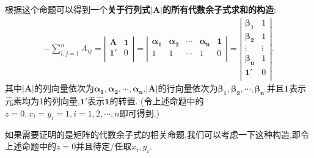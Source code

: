 \documentclass[../../main.tex]{subfiles}%
\begin{document}
\begin{note}\label{关于行列式|A|所有代数余子式求和的构造}
根据这个命题可以得到一个\textbf{关于行列式$|\boldsymbol{A}|$的所有代数余子式求和的构造}:
\begin{align*}
-\sum_{i,j=1}^n{A_{ij}}=\left| \begin{matrix}
\boldsymbol{A}&		\mathbf{1}\\
\mathbf{1}'&		0\\
\end{matrix} \right|=\left| \begin{matrix}
\boldsymbol{\alpha }_{\mathbf{1}}&		\boldsymbol{\alpha }_{\mathbf{2}}&		\cdots&		\boldsymbol{\alpha }_{\boldsymbol{n}}&		\mathbf{1}\\
1&		1&		\cdots&		1&		0\\
\end{matrix} \right|=\left| \begin{matrix}
\boldsymbol{\beta }_{\mathbf{1}}&		1\\
\boldsymbol{\beta }_{\mathbf{2}}&		1\\
\vdots&		\vdots\\
\boldsymbol{\beta }_{\boldsymbol{n}}&		1\\
\mathbf{1}'&		0\\
\end{matrix} \right|.
\end{align*}
其中$|\boldsymbol{A}|$的列向量依次为$\boldsymbol{\alpha }_{\mathbf{1}},\boldsymbol{\alpha }_{\mathbf{2}},\cdots ,\boldsymbol{\alpha }_{\boldsymbol{n}}$,$|\boldsymbol{A}|$的行向量依次为$\boldsymbol{\beta }_{\mathbf{1}},\boldsymbol{\beta }_{\mathbf{2}},\cdots ,\boldsymbol{\beta }_{\boldsymbol{n}}$.并且$\mathbf{1}$表示元素均为1的列向量,$\mathbf{1}'$表示$\mathbf{1}$的转置.
(令上述命题中的$z=0,x_i=y_i=1,i=1,2,\cdots,n$即可得到.)
\end{note}
\begin{remark}
如果需要证明的是矩阵的代数余子式的相关命题,我们可以考虑一下这种构造,即令上述命题中的$z=0$并且待定/任取$x_i,y_i$.
\end{remark}
\end{document}
